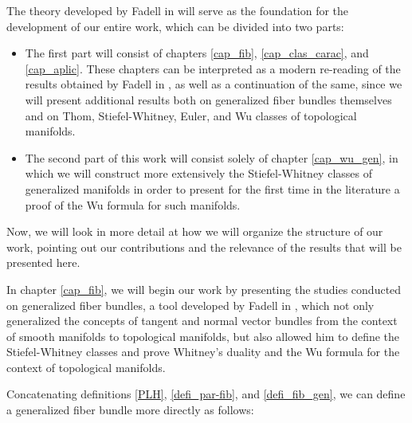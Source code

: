 \documentclass[12pt,oneside]{book}
\begin{document}
    The theory developed by Fadell in \cite{fadell_1} will serve as the foundation for the development 
    of our entire work, which can be divided into two parts:
        \begin{itemize}
            \item The first part will consist of chapters \ref{cap_fib}, \ref{cap_clas_carac}, and 
            \ref{cap_aplic}. These chapters can be interpreted as a modern re-reading of the results 
            obtained by Fadell in \cite{fadell_1}, as well as a continuation of the same, since we will 
            present additional results both on generalized fiber bundles themselves and on Thom, 
            Stiefel-Whitney, Euler, and Wu classes of topological manifolds.
            \item The second part of this work will consist solely of chapter \ref{cap_wu_gen}, in which 
            we will construct more extensively the Stiefel-Whitney classes of generalized manifolds in 
            order to present for the first time in the literature a proof of the Wu formula for such 
            manifolds.
        \end{itemize}
    
    Now, we will look in more detail at how we will organize the structure of our work, pointing out our 
    contributions and the relevance of the results that will be presented here.
    
    In chapter \ref{cap_fib}, we will begin our work by presenting the studies conducted on generalized 
    fiber bundles, a tool developed by Fadell in \cite{fadell_1}, which 
    not only generalized the concepts of tangent and normal vector bundles from the context of smooth 
    manifolds to topological manifolds, but also allowed him to define the 
    Stiefel-Whitney classes and prove Whitney's 
    duality and the Wu formula for the context of topological 
    manifolds.
    
    Concatenating definitions \ref{PLH}, \ref{defi_par-fib}, and \ref{defi_fib_gen}, we can define a 
    generalized fiber bundle more directly as follows:

    \
\end{document}
